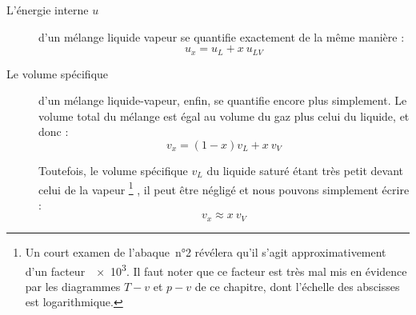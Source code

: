 \begin{description}
			\item[L’énergie interne $u$]{d’un mélange liquide vapeur se quantifie exactement de la même manière :
				\begin{equation}
					u_x = u_L + x \ u_{LV}
					\label{eq_titre_energie_interne}
				\end{equation}

			} %

			\clearfloats %
			\item[Le volume spécifique]{d’un mélange liquide-vapeur, enfin, se quantifie encore plus simplement. Le volume total du mélange est égal au volume du gaz plus celui du liquide, et donc :
				\begin{equation*}
					v_x = (1-x) v_L + x \ v_V
				\end{equation*}

				Toutefois, le volume spécifique $v_L$ du liquide saturé étant très petit devant celui de la vapeur%
					\footnote{Un court examen de l’abaque~n°2 révélera qu’il s’agit approximativement d’un facteur~\num{e3}. Il faut noter que ce facteur est très mal mis en évidence par les diagrammes $T-v$ et $p-v$ de ce chapitre, dont l’échelle des abscisses est logarithmique.}%
				, il peut être négligé et nous pouvons simplement écrire :
				\begin{equation}
					v_x \approx x \ v_V
					\label{eq_titre_volume_specifique}
				\end{equation}


}
\end{description}
